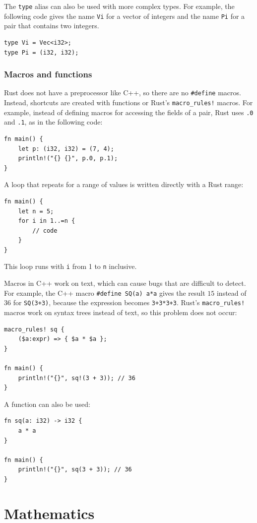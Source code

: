 The \texttt{type} alias
can also be used with more complex types.
For example, the following code gives
the name \texttt{Vi} for a vector of integers
and the name \texttt{Pi} for a pair
that contains two integers.
\begin{lstlisting}
type Vi = Vec<i32>;
type Pi = (i32, i32);
\end{lstlisting}

\subsubsection{Macros and functions}
Rust does not have a preprocessor like C++,
so there are no \texttt{\#define} macros.
Instead, shortcuts are created with
functions or Rust's \texttt{macro\_rules!} macros.
For example, instead of defining macros for
accessing the fields of a pair,
Rust uses \texttt{.0} and \texttt{.1},
as in the following code:
\begin{lstlisting}
fn main() {
    let p: (i32, i32) = (7, 4);
    println!("{} {}", p.0, p.1);
}
\end{lstlisting}

A loop that repeats for a range of values
is written directly with a Rust range:
\begin{lstlisting}
fn main() {
    let n = 5;
    for i in 1..=n {
        // code
    }
}
\end{lstlisting}
This loop runs with \texttt{i} from 1 to \texttt{n}
inclusive.

Macros in C++ work on text, which can cause bugs
that are difficult to detect.
For example, the C++ macro
\texttt{\#define SQ(a) a*a}
gives the result $15$ instead of $36$
for \texttt{SQ(3+3)},
because the expression becomes \texttt{3+3*3+3}.
Rust's \texttt{macro\_rules!} macros work on
syntax trees instead of text,
so this problem does not occur:
\begin{lstlisting}
macro_rules! sq {
    ($a:expr) => { $a * $a };
}

fn main() {
    println!("{}", sq!(3 + 3)); // 36
}
\end{lstlisting}
A function can also be used:
\begin{lstlisting}
fn sq(a: i32) -> i32 {
    a * a
}

fn main() {
    println!("{}", sq(3 + 3)); // 36
}
\end{lstlisting}

\section{Mathematics}

